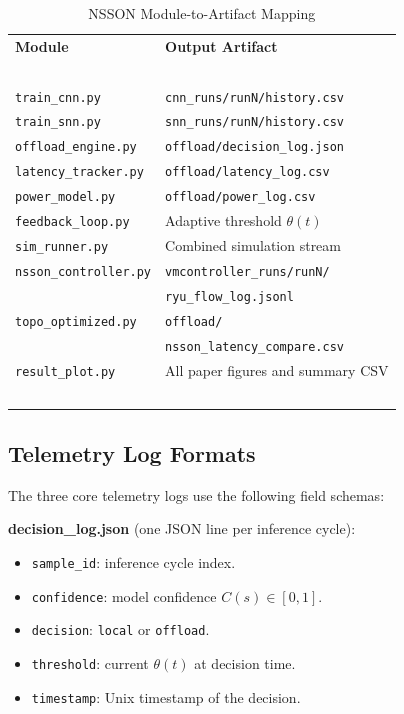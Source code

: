 \documentclass[journal]{IEEEtran}
\begin{document}
\begin{table}[!t]
\caption{NSSON Module-to-Artifact Mapping}
\label{tab:modules}
\centering
\footnotesize
\renewcommand{\arraystretch}{1.1}
\setlength{\tabcolsep}{3pt}
\begin{tabular}{p{}p{}}
\toprule
\textbf{Module} & \textbf{Output Artifact} \\\ \\
\midrule
\texttt{train\_cnn.py} & \texttt{cnn\_runs/runN/history.csv} \\
\texttt{train\_snn.py} & \texttt{snn\_runs/runN/history.csv} \\
\texttt{offload\_engine.py} & \texttt{offload/decision\_log.json} \\
\texttt{latency\_tracker.py} & \texttt{offload/latency\_log.csv} \\
\texttt{power\_model.py} & \texttt{offload/power\_log.csv} \\
\texttt{feedback\_loop.py} & Adaptive threshold $\theta(t)$ \\
\texttt{sim\_runner.py} & Combined simulation stream \\
\texttt{nsson\_controller.py} & \texttt{vmcontroller\_runs/runN/} \\
& \texttt{ryu\_flow\_log.jsonl} \\
\texttt{topo\_optimized.py} & \texttt{offload/} \\
& \texttt{nsson\_latency\_compare.csv} \\
\texttt{result\_plot.py} & All paper figures and summary CSV \\\ \\
\bottomrule
\end{tabular}
\end{table}

\subsection{Telemetry Log Formats}

The three core telemetry logs use the following field schemas:

\textbf{decision\_log.json} (one JSON line per inference cycle):
\begin{itemize}
\item \texttt{sample\_id}: inference cycle index.
\item \texttt{confidence}: model confidence $C(s) \in [0,1]$.
\item \texttt{decision}: \texttt{local} or \texttt{offload}.
\item \texttt{threshold}: current $\theta(t)$ at decision time.
\item \texttt{timestamp}: Unix timestamp of the decision.
\end{itemize}
\end{document}

